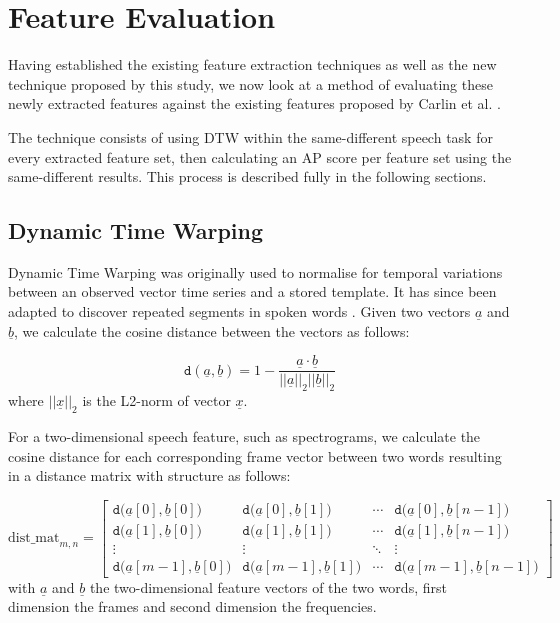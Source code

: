 \chapter{Feature Evaluation}
\label{chap:evaluation}

Having established the existing feature extraction techniques as well as the new technique proposed by this study, we now look at a method of evaluating these newly extracted features against the existing features proposed by Carlin et al. \cite{DBLP:conf/interspeech/CarlinTJH11}.

The technique consists of using DTW within the same-different speech task for every extracted feature set, then calculating an AP score per feature set using the same-different results.
This process is described fully in the following sections.

\section{Dynamic Time Warping}

Dynamic Time Warping was originally used to normalise for temporal variations between an observed vector time series and a stored template.
It has since been adapted to discover repeated segments in spoken words \cite{DBLP:conf/interspeech/CarlinTJH11}. Given two vectors $\underline{a}$ and $\underline{b}$, we calculate the cosine distance between the vectors as follows:

\begin{equation}
    \mathtt{d}(\underline{a}, \underline{b}) = 1 - \displaystyle\frac{\underline{a} \cdot \underline{b}}{{||\underline{a}||}_2 {||\underline{b}||}_2}
\end{equation}
where ${||\underline{x}||}_2$ is the L2-norm of vector $\underline{x}$.

For a two-dimensional speech feature, such as spectrograms, we calculate the cosine distance for each corresponding frame vector between two words resulting in a distance matrix with structure as follows:

\begin{equation}
    {\mathrm{dist\_mat}}_{m,n} = 
 \begin{bmatrix}
  \mathtt{d}\big(\underline{a}[0], \underline{b}[0]\big) & \mathtt{d}\big(\underline{a}[0], \underline{b}[1]\big) & \cdots & \mathtt{d}\big(\underline{a}[0], \underline{b}[n-1]\big) \\
  \mathtt{d}\big(\underline{a}[1], \underline{b}[0]\big) & \mathtt{d}\big(\underline{a}[1], \underline{b}[1]\big) & \cdots & \mathtt{d}\big(\underline{a}[1], \underline{b}[n-1]\big) \\
  \vdots  & \vdots  & \ddots & \vdots  \\
  \mathtt{d}\big(\underline{a}[m-1], \underline{b}[0]\big) & \mathtt{d}\big(\underline{a}[m-1], \underline{b}[1]\big) & \cdots & \mathtt{d}\big(\underline{a}[m-1], \underline{b}[n-1]\big)
 \end{bmatrix}
\end{equation}
with $\underline{a}$ and $\underline{b}$ the two-dimensional feature vectors of the two words, first dimension the frames and second dimension the frequencies. 


